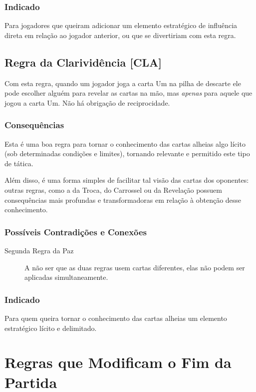 \subsubsection{Indicado}

Para jogadores que queiram adicionar um elemento estratégico de influência direta em relação ao jogador anterior, ou que se divertiriam com esta regra.

\subsection{Regra da Clarividência [CLA]}

Com esta regra, quando um jogador joga a carta Um na pilha de descarte ele pode escolher alguém para revelar as cartas na mão, mas \emph{apenas} para aquele que jogou a carta Um. Não há obrigação de reciprocidade.

\subsubsection{Consequências}

Esta é uma boa regra para tornar o conhecimento das cartas alheias algo lícito (sob determinadas condições e limites), tornando relevante e permitido este tipo de tática.

Além disso, é uma forma simples de facilitar tal visão das cartas dos oponentes: outras regras, como a da Troca, do Carrossel ou da Revelação possuem consequências mais profundas e transformadoras em relação à obtenção desse conhecimento. 

\subsubsection{Possíveis Contradições e Conexões}

\begin{description}
\item[Segunda Regra da Paz]{A não ser que as duas regras usem cartas diferentes, elas não podem ser aplicadas simultaneamente.}
\end{description}

\subsubsection{Indicado} 

Para quem queira tornar o conhecimento das cartas alheias um elemento estratégico lícito e delimitado.

\section{Regras que Modificam o Fim da Partida}

